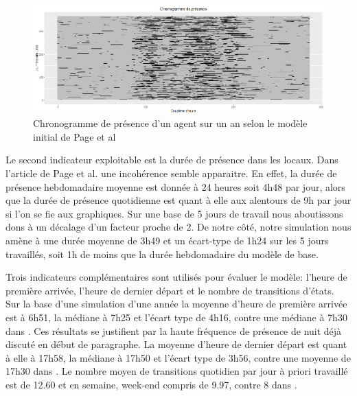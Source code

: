 \begin{figure}[H]
\centering
\includegraphics[scale=0.46]{Images/PageActivities/ChronogrammeBase}
\caption{Chronogramme de présence d'un agent sur un an selon le modèle initial de Page et al \cite{Page-08}}
\label{fig:ChronogrammeBase}
\end{figure}

Le second indicateur exploitable est la durée de présence dans les locaux. Dans l'article de Page et al. \cite{Page-08} une incohérence semble apparaitre. En effet, la durée de présence hebdomadaire moyenne est donnée à 24 heures soit 4h48 par jour, alors que la durée de présence quotidienne est quant à elle aux alentours de 9h par jour si l'on se fie aux graphiques. Sur une base de 5 jours de travail nous aboutissons dons à un décalage d'un facteur proche de 2. De notre côté, notre simulation nous amène à une durée moyenne de 3h49 et un écart-type de 1h24 sur les 5 jours travaillés, soit 1h de moins que la durée hebdomadaire du modèle de base.

Trois indicateurs complémentaires sont utilisés pour évaluer le modèle: l'heure de première arrivée, l'heure de dernier départ et le nombre de transitions d'états. Sur la base d'une simulation d'une année la moyenne d'heure de première arrivée est à 6h51, la médiane à 7h25 et l'écart type de 4h16, contre une médiane à 7h30 dans \cite{Page-08}. Ces résultats se justifient par la haute fréquence de présence de nuit déjà discuté en début de paragraphe. La moyenne d'heure de dernier départ est quant à elle à 17h58, la médiane à 17h50 et l'écart type de 3h56, contre une moyenne de 17h30 dans \cite{Page-08}. Le nombre moyen de transitions quotidien par jour à priori travaillé est de 12.60 et en semaine, week-end compris de 9.97, contre 8 dans \cite{Page-08}.

